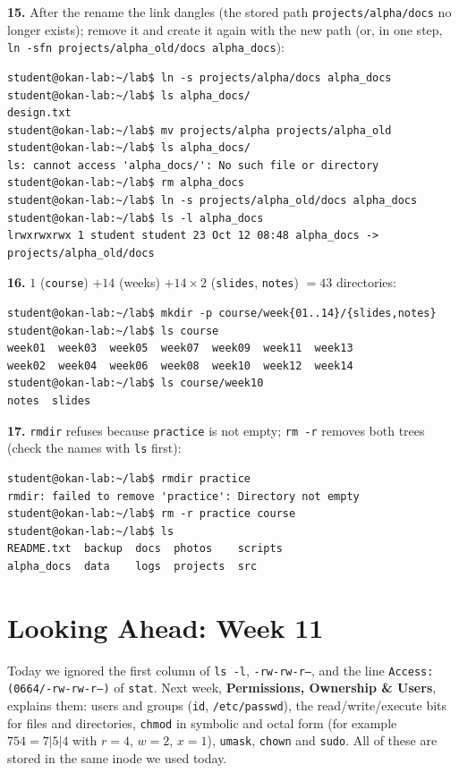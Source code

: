 \documentclass[11pt,a4paper]{article}
\newcommand{\cmd}[1]{\texttt{#1}}
\begin{document}
\textbf{15.} After the rename the link dangles (the stored path \texttt{projects/alpha/docs} no longer exists); remove it and create it again with the new path (or, in one step, \cmd{ln -sfn projects/alpha\_old/docs alpha\_docs}):
\begin{lstlisting}[style=term,basicstyle=\ttfamily\scriptsize\color{light}]
student@okan-lab:~/lab$ ln -s projects/alpha/docs alpha_docs
student@okan-lab:~/lab$ ls alpha_docs/
design.txt
student@okan-lab:~/lab$ mv projects/alpha projects/alpha_old
student@okan-lab:~/lab$ ls alpha_docs/
ls: cannot access 'alpha_docs/': No such file or directory
student@okan-lab:~/lab$ rm alpha_docs
student@okan-lab:~/lab$ ln -s projects/alpha_old/docs alpha_docs
student@okan-lab:~/lab$ ls -l alpha_docs
lrwxrwxrwx 1 student student 23 Oct 12 08:48 alpha_docs -> projects/alpha_old/docs
\end{lstlisting}

\textbf{16.} $1$ (\texttt{course}) $+ 14$ (weeks) $+ 14 \times 2$ (\texttt{slides}, \texttt{notes}) $= 43$ directories:
\begin{lstlisting}[style=term,basicstyle=\ttfamily\scriptsize\color{light}]
student@okan-lab:~/lab$ mkdir -p course/week{01..14}/{slides,notes}
student@okan-lab:~/lab$ ls course
week01  week03  week05  week07  week09  week11  week13
week02  week04  week06  week08  week10  week12  week14
student@okan-lab:~/lab$ ls course/week10
notes  slides
\end{lstlisting}

\textbf{17.} \cmd{rmdir} refuses because \texttt{practice} is not empty; \cmd{rm -r} removes both trees (check the names with \cmd{ls} first):
\begin{lstlisting}[style=term,basicstyle=\ttfamily\scriptsize\color{light}]
student@okan-lab:~/lab$ rmdir practice
rmdir: failed to remove 'practice': Directory not empty
student@okan-lab:~/lab$ rm -r practice course
student@okan-lab:~/lab$ ls
README.txt  backup  docs  photos    scripts
alpha_docs  data    logs  projects  src
\end{lstlisting}

\section{Looking Ahead: Week 11}

Today we ignored the first column of \cmd{ls -l}, \texttt{-rw-rw-r--}, and the line \texttt{Access: (0664/-rw-rw-r--)} of \cmd{stat}. Next week, \textbf{Permissions, Ownership \& Users}, explains them: users and groups (\cmd{id}, \texttt{/etc/passwd}), the read/write/execute bits for files and directories, \cmd{chmod} in symbolic and octal form (for example $754 = 7|5|4$ with $r = 4$, $w = 2$, $x = 1$), \cmd{umask}, \cmd{chown} and \cmd{sudo}. All of these are stored in the same inode we used today.
\end{document}
